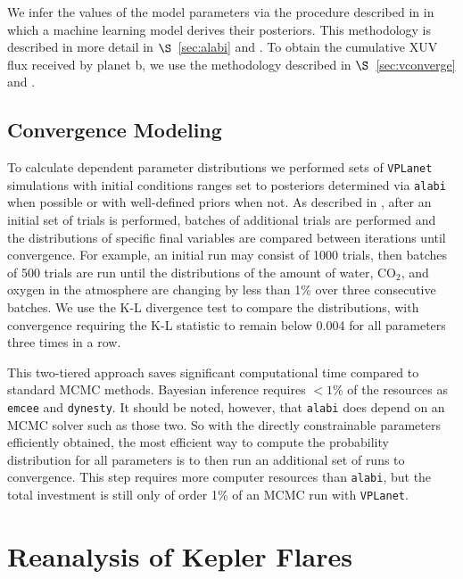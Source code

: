 \documentclass[preprint]{aastex631}
\def\vplanet{\texttt{\footnotesize{VPLanet}}\xspace}
\def\alabi{\texttt{\footnotesize{alabi}}\xspace}
\def\coo{{CO$_2$}\xspace}
\begin{document}
We infer the values of the model parameters via the procedure described in \cite{Fleming20} in which a machine learning model derives their posteriors. This methodology is described in more detail in $\S$~\ref{sec:alabi} and \cite{Birky25}. To obtain the cumulative XUV flux received by planet b, we use the methodology described in $\S$~\ref{sec:vconverge} and \cite{Gialluca24}.

\subsection{Convergence Modeling\label{sec:vconverge}}

To calculate dependent parameter distributions we performed sets of \vplanet simulations with initial conditions ranges set to posteriors determined via \alabi when possible or with well-defined priors when not. As described in \cite{Gialluca24}, after an initial set of trials is performed, batches of additional trials are performed and the distributions of specific final variables are compared between iterations until convergence. For example, an initial run may consist of 1000 trials, then batches of 500 trials are run until the distributions of the amount of water, \coo, and oxygen in the atmosphere are changing by less than 1\% over three consecutive batches. We use the K-L divergence test to compare the distributions, with convergence requiring the K-L statistic to remain below 0.004 for all parameters three times in a row.

This two-tiered approach saves significant computational time compared to standard MCMC methods. Bayesian inference requires $<1$\% of the resources as \texttt{emcee} and \texttt{dynesty}. It should be noted, however, that \alabi does depend on an MCMC solver such as those two. So with the directly constrainable parameters efficiently obtained, the most efficient way to compute the probability distribution for all parameters is to then run an additional set of runs to convergence. This step requires more computer resources than \alabi, but the total investment is still only of order 1\% of an MCMC run with \vplanet.

\section{Reanalysis of Kepler Flares\label{sec:kepler}}
\end{document}
